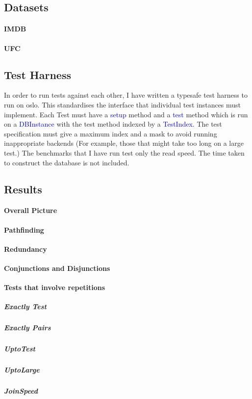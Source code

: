 \documentclass[12pt,a4paper,twoside,openright]{report}
\newcommand\codeName[1]{\textcolor{blue}{#1}}
\begin{document}
{	\subsection{Datasets}
		\paragraph{IMDB}
		\paragraph{UFC}
	\subsection{Test Harness}
	In order to run tests against each other, I have written a typesafe test harness to run on oslo. This standardises the interface that individual test instances must implement. Each Test must have a \codeName{setup} method and a \codeName{test} method which is run on a \codeName{DBInstance} with the test method indexed by a \codeName{TestIndex}. The test specification must give a maximum index and a mask to avoid running inappropriate backends (For example, those that might take too long on a large test.) The benchmarks that I have run test only the read speed. The time taken to construct the database is not included.
	
	\subsection{Results}
		\paragraph{Overall Picture}
		\paragraph{Pathfinding}
		\paragraph{Redundancy}
		\paragraph{Conjunctions and Disjunctions}
		\paragraph{Tests that involve repetitions}
			\subparagraph{Exactly Test}
			\subparagraph{Exactly Pairs}
			\subparagraph{UptoTest}
			\subparagraph{UptoLarge}
			\subparagraph{JoinSpeed}
}
\end{document}
